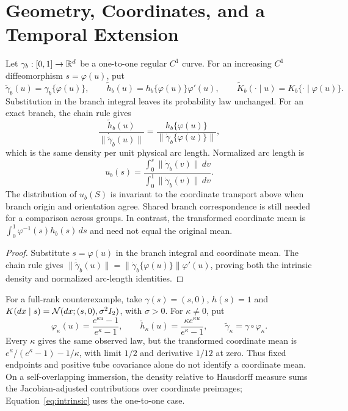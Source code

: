 \section{Geometry, Coordinates, and a Temporal Extension}
\label{app:geometry}
\begin{proposition}
\label{prop:coordinate-transport}
Let $\gamma_b:[0,1]\to\mathbb R^d$ be a one-to-one regular $C^1$ curve.
For an increasing $C^1$ diffeomorphism $s=\varphi(u)$, put
\[
 \widetilde\gamma_b(u)=\gamma_b\{\varphi(u)\},\qquad
 \widetilde h_b(u)=h_b\{\varphi(u)\}\varphi'(u),\qquad
 \widetilde K_b(\cdot\mid u)=K_b\{\cdot\mid\varphi(u)\}.
\]
Substitution in the branch integral leaves its probability law unchanged.
For an exact branch, the chain rule gives
\[
 \frac{\widetilde h_b(u)}{\|\dot{\widetilde\gamma}_b(u)\|}
 =\frac{h_b\{\varphi(u)\}}{\|\dot\gamma_b\{\varphi(u)\}\|},
\]
which is the same density per unit physical arc length. Normalized arc length
is
\[
 u_b(s)=\frac{\int_0^s\|\dot\gamma_b(v)\|\,dv}
                  {\int_0^1\|\dot\gamma_b(v)\|\,dv}.
\]
The distribution of $u_b(S)$ is invariant to the coordinate transport above
when branch origin and orientation agree. Shared branch correspondence is
still needed for a comparison across groups. In contrast, the transformed
coordinate mean is
$\int_0^1\varphi^{-1}(s)h_b(s)\,ds$ and need not equal the original mean.
\end{proposition}
\begin{proof}
Substitute $s=\varphi(u)$ in the branch integral and coordinate mean.
The chain rule gives
$\|\dot{\widetilde\gamma}_b(u)\|
=\|\dot\gamma_b\{\varphi(u)\}\|\varphi'(u)$, proving both the intrinsic
density and normalized arc-length identities.
\end{proof}
For a full-rank counterexample, take $\gamma(s)=(s,0)$, $h(s)=1$ and
$K(dx\mid s)=\mathcal N(dx;(s,0),\sigma^2I_2)$, with $\sigma>0$.
For $\kappa\ne0$, put
\[
 \varphi_\kappa(u)=\frac{e^{\kappa u}-1}{e^\kappa-1},\qquad
 \widetilde h_\kappa(u)=\frac{\kappa e^{\kappa u}}{e^\kappa-1},\qquad
 \widetilde\gamma_\kappa=\gamma\circ\varphi_\kappa.
\]
Every $\kappa$ gives the same observed law, but the transformed coordinate
mean is $e^\kappa/(e^\kappa-1)-1/\kappa$, with limit $1/2$ and derivative
$1/12$ at zero. Thus fixed endpoints and positive tube covariance alone do
not identify a coordinate mean. On a self-overlapping immersion,
the density relative to Hausdorff measure sums the Jacobian-adjusted
contributions over coordinate preimages; Equation~\ref{eq:intrinsic} uses
the one-to-one case.

